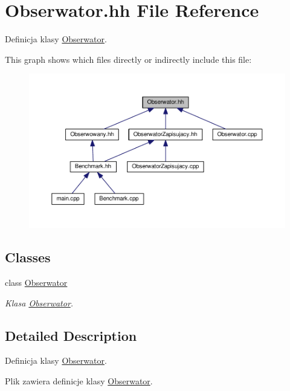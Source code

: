 \hypertarget{a00051}{}\section{Obserwator.\+hh File Reference}
\label{a00051}


Definicja klasy \hyperlink{a00015}{Obserwator}.  


This graph shows which files directly or indirectly include this file\+:
\nopagebreak
\begin{figure}[H]
\begin{center}
\leavevmode
\includegraphics[width=350pt]{a00105}
\end{center}
\end{figure}
\subsection*{Classes}
\begin{DoxyCompactItemize}
\item 
class \hyperlink{a00015}{Obserwator}
\begin{DoxyCompactList}\small\item\em Klasa \hyperlink{a00015}{Obserwator}. \end{DoxyCompactList}\end{DoxyCompactItemize}


\subsection{Detailed Description}
Definicja klasy \hyperlink{a00015}{Obserwator}. 

Plik zawiera definicje klasy \hyperlink{a00015}{Obserwator}. 